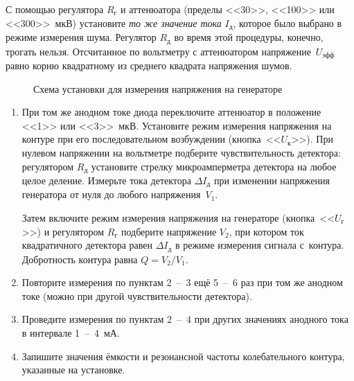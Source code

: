 \begin{lab:task}
\begin{enumerate}
С помощью регулятора $R_{г}$ и аттенюатора (пределы <<30>>, <<100>> или
<<300>>~мкВ) установите \emph{то же значение тока} $I_{д}$,
которое было выбрано в режиме измерения шума. Регулятор $R_{д}$ во время
этой процедуры, конечно, трогать нельзя. Отсчитанное по вольтметру
с аттенюатором напряжение~$U_{эфф}$ равно корню квадратному из среднего
квадрата напряжения шумов.

\end{enumerate}

\begin{figure}[h!]
    \caption{Схема установки для измерения напряжения на генераторе}
\end{figure}


\begin{enumerate}
	\item При том же анодном токе диода переключите аттенюатор в положение <<1>>
или <<3>>~мкВ. Установите режим измерения
напряжения на контуре при его последовательном возбуждении
(кнопка~<<$U_{\text{к}}$>>). При нулевом напряжении на вольтметре
подберите чувствительность детектора: регулятором $R_{\text{д}}$ установите
стрелку микроамперметра детектора на любое целое
деление. Измерьте  тока детектора $\Delta I_{\text{д}}$
при изменении напряжения генератора от нуля до любого
напряжения~$V_1$.

Затем включите режим измерения напряжения на генераторе
(кнопка~<<$U_{\text{г}}$>>) и регулятором $R_{\text{г}}$ подберите напряжение
$V_2$, при котором ток квадратичного детектора равен 
$\Delta I_{\text{д}}$ в режиме измерения сигнала с~контура.
Добротность контура равна $Q=V_2/V_1$.

	\item Повторите измерения по пунктам 2~--~3 ещё 5~--~6 раз при том же
анодном токе (можно при другой
чувствительности детектора).

	\item Проведите измерения по пунктам 2~--~4 при других значениях анодного
тока в интервале 1~--~4~мА.

	\item Запишите значения ёмкости и резонансной частоты колебательного
контура, указанные на установке.

\end{enumerate}


\end{lab:task}
